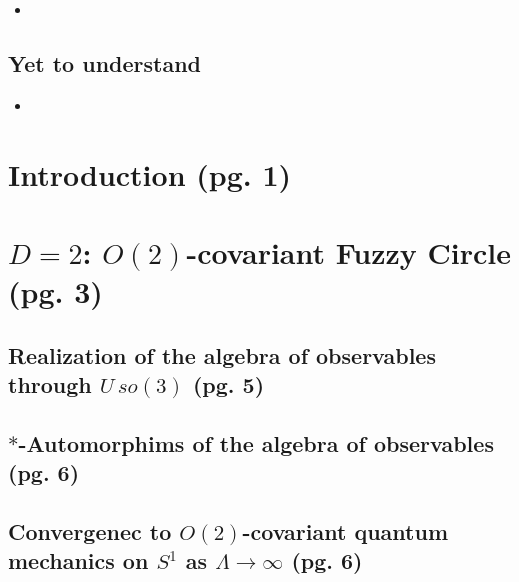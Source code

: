 \documentclass{article}
\begin{document}
    \begin{itemize}

    \item 
    
    \end{itemize}

\subsection{Yet to understand}

    \begin{itemize}

    \item 
    
    \end{itemize}

\section{Introduction (pg. 1)}


\section{$D = 2$: $O(2)$-covariant Fuzzy Circle (pg. 3)}

\subsection{Realization of the algebra of observables through $U\,so(3)$ (pg. 5)}

\subsection{$*$-Automorphims of the algebra of observables (pg. 6)}


\subsection{Convergenec to $O(2)$-covariant quantum mechanics on $S^1$ as $\Lambda \to \infty$ (pg. 6)}
\end{document}
